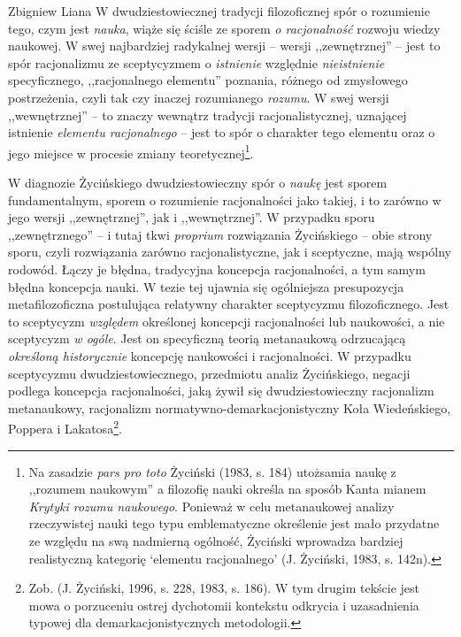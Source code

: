 \begin{artplenv}{Zbigniew Liana}
W dwudziestowiecznej tradycji filozoficznej spór o rozumienie tego, czym jest \textit{nauka}, wiąże się ściśle ze
sporem \textit{o racjonalność }rozwoju wiedzy naukowej. W swej najbardziej radykalnej wersji -- wersji ,,zewnętrznej'' –
jest to spór racjonalizmu ze sceptycyzmem o \textit{istnienie} względnie \textit{nieistnienie} specyficznego, ,,racjonalnego
elementu'' poznania, różnego od zmysłowego postrzeżenia, czyli tak czy inaczej rozumianego \textit{rozumu}. W swej wersji
,,wewnętrznej'' -- to znaczy wewnątrz tradycji racjonalistycznej, uznającej istnienie \textit{elementu racjonalnego} -- jest
to spór o charakter tego elementu oraz o jego miejsce w procesie zmiany teoretycznej\footnote{Na zasadzie \textit{pars
		pro toto} Życiński \label{ref:RND1yjaBGa3S8}(1983, s. 184) utożsamia naukę z ,,rozumem naukowym'' a filozofię nauki
	określa na sposób Kanta mianem \textit{Krytyki rozumu naukowego}. Ponieważ w celu metanaukowej analizy rzeczywistej nauki
	tego typu emblematyczne określenie jest mało przydatne ze względu na swą nadmierną ogólność, Życiński wprowadza
	bardziej realistyczną kategorię ‘elementu racjonalnego’ \label{ref:RNDZsYVuB7lRL}(J. Życiński, 1983, s. 142n).}.

W diagnozie Życińskiego dwudziestowieczny spór o \textit{naukę} jest sporem fundamentalnym, sporem o rozumienie
racjonalności jako takiej, i to zarówno w jego wersji ,,zewnętrznej'', jak i ,,wewnętrznej''. W przypadku sporu
,,zewnętrznego'' -- i tutaj tkwi \textit{proprium} rozwiązania Życińskiego -- obie strony sporu, czyli rozwiązania zarówno
racjonalistyczne, jak i sceptyczne, mają wspólny rodowód. Łączy je błędna, tradycyjna koncepcja racjonalności, a tym
samym błędna koncepcja nauki. W tezie tej ujawnia się ogólniejsza presupozycja metafilozoficzna postulująca relatywny
charakter sceptycyzmu filozoficznego. Jest to sceptycyzm \textit{względem} określonej koncepcji racjonalności lub
naukowości, a nie sceptycyzm \textit{w ogóle}. Jest on specyficzną teorią metanaukową odrzucającą \textit{określoną
	historycznie} koncepcję naukowości i racjonalności. W przypadku sceptycyzmu dwudziestowiecznego, przedmiotu analiz
Życińskiego, negacji podlega koncepcja racjonalności, jaką żywił się dwudziestowieczny racjonalizm metanaukowy,
racjonalizm normatywno-demarkacjonistyczny Koła Wiedeńskiego, Poppera i Lakatosa\footnote{Zob.
	\label{ref:RNDM0IkZEEMNb}(J. Życiński, 1996, s. 228, 1983, s. 186). W tym drugim tekście jest mowa o porzuceniu ostrej
	dychotomii kontekstu odkrycia i uzasadnienia typowej dla demarkacjonistycznych metodologii.}.


\end{artplenv}
